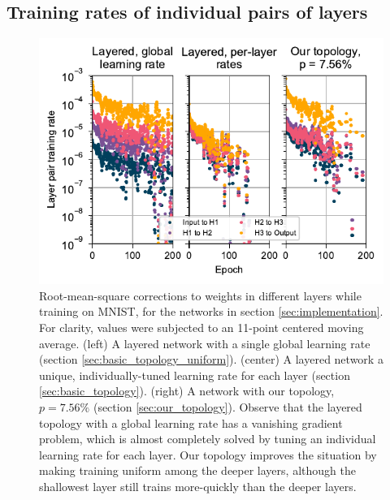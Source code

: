 \documentclass[format=sigconf]{acmart}
\begin{document}
\subsection{Training rates of individual pairs of layers}
\label{sec:mnist_perlayer}

\begin{figure}
  \centering
  \includegraphics[width=\columnwidth]{figures/MNIST_individual_layers.pdf}
  \caption{Root-mean-square corrections to weights in different layers while training on MNIST, for the networks in section \ref{sec:implementation}. For clarity, values were subjected to an 11-point centered moving average. (left) A layered network with a single global learning rate (section \ref{sec:basic_topology_uniform}). (center) A layered network a unique, individually-tuned learning rate for each layer (section \ref{sec:basic_topology}).  (right) A network with our topology, $p = 7.56\%$ (section \ref{sec:our_topology}). Observe that the layered topology with a global learning rate has a vanishing gradient problem, which is almost completely solved by tuning an individual learning rate for each layer. Our topology improves the situation by making training uniform among the deeper layers, although the shallowest layer still trains more-quickly than the deeper layers.}  
  \label{fig:mnist_layers}
\end{figure}
\end{document}
